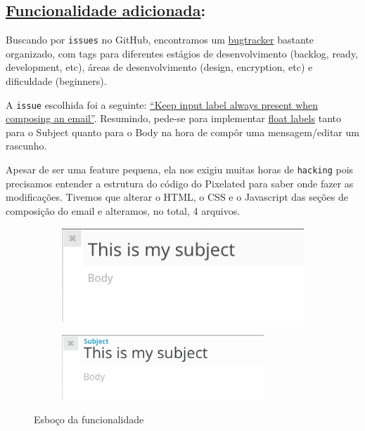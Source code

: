 \subsection*{\underline{Funcionalidade adicionada}:}

Buscando por \texttt{issues} no GitHub, encontramos um
\href{https://github.com/pixelated-project/pixelated-user-agent/issues/}
{bugtracker} bastante organizado, com tags para
diferentes estágios de desenvolvimento (backlog, ready, development, etc),
áreas de desenvolvimento (design, encryption, etc) e dificuldade (beginners).

A \texttt{issue} escolhida foi a seguinte:
\href{https://github.com/pixelated-project/pixelated-user-agent/issues/384}
{``Keep input label always present when composing an email''}. Resumindo, pede-se
para implementar
\href{http://bradfrost.com/blog/post/float-label-pattern}{float labels} tanto para o
Subject quanto para o Body na hora de compôr uma mensagem/editar um rascunho.

Apesar de ser uma feature pequena, ela nos exigiu muitas horas de \texttt{hacking} pois
precisamos entender a estrutura do código do Pixelated para saber onde fazer as
modificações. Tivemos que alterar o HTML, o CSS e o Javascript das seções de
composição do email e alteramos, no total, 4 arquivos.

\begin{figure}[h]
\centering
\begin{subfigure}{.5\textwidth}
  \centering
  \includegraphics[width=.75\linewidth]{src/issue1.png}
\end{subfigure}%
\begin{subfigure}{.5\textwidth}
  \centering
  \includegraphics[width=.9\linewidth]{src/issue2.png}
\end{subfigure}
\caption*{Esboço da funcionalidade}
\end{figure}

